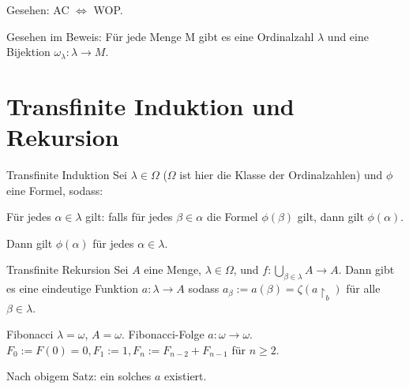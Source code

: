 \documentclass[12pt]{article}
\begin{document}
Gesehen: AC $\iff$ WOP.
 
Gesehen im Beweis: Für jede Menge M gibt es eine Ordinalzahl $\lambda$ und eine Bijektion $\omega_\lambda: \lambda \rightarrow M$.

\section{Transfinite Induktion und Rekursion}

\begin{remark}{Transfinite Induktion}{}
Sei $\lambda \in \Omega$ ($\Omega$ ist hier die Klasse der Ordinalzahlen) und $\phi$ eine Formel, sodass:

Für jedes $\alpha \in \lambda$ gilt: falls für jedes $\beta \in \alpha$ die Formel $\phi(\beta)$ gilt, dann gilt $\phi(\alpha)$.

Dann gilt $\phi(\alpha)$ für jedes $\alpha \in \lambda$.
\end{remark}

\begin{remark}{Transfinite Rekursion}{}
Sei $A$ eine Menge, $\lambda \in \Omega$, und $f: \bigcup\limits_{\beta \in \lambda}{} A \rightarrow A$. Dann gibt es eine eindeutige Funktion $a: \lambda \rightarrow A$ sodass $a_\beta := a(\beta) = \zeta(a\restriction_{b})$ für alle $\beta \in \lambda$.
\end{remark}

\begin{example}{Fibonacci}{}
$\lambda = \omega$, $A = \omega$. Fibonacci-Folge $a: \omega \rightarrow \omega$. $F_0 := F(0) = 0, F_1 := 1, F_n := F_{n-2} + F_{n-1}$ für $n \geq 2$.

Nach obigem Satz: ein solches $a$ existiert.
\end{example}
\end{document}

